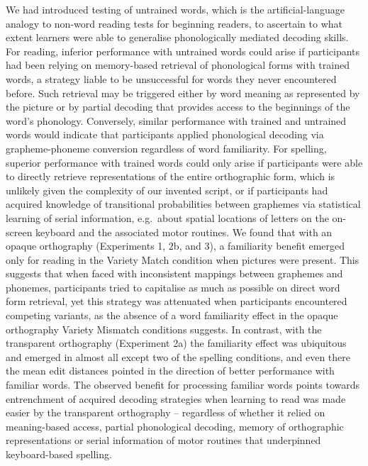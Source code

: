 \documentclass[doc,floatsintext]{apa6}
\begin{document}
We had introduced testing of untrained words, which is the
artificial-language analogy to non-word reading tests for beginning
readers, to ascertain to what extent learners were able to generalise
phonologically mediated decoding skills. For reading, inferior
performance with untrained words could arise if participants had been
relying on memory-based retrieval of phonological forms with trained
words, a strategy liable to be unsuccessful for words they never
encountered before. Such retrieval may be triggered either by word
meaning as represented by the picture or by partial decoding that
provides access to the beginnings of the word's phonology. Conversely,
similar performance with trained and untrained words would indicate that
participants applied phonological decoding via grapheme-phoneme
conversion regardless of word familiarity. For spelling, superior
performance with trained words could only arise if participants were
able to directly retrieve representations of the entire orthographic
form, which is unlikely given the complexity of our invented script, or
if participants had acquired knowledge of transitional probabilities
between graphemes via statistical learning of serial information,
e.g.~about spatial locations of letters on the on-screen keyboard and
the associated motor routines. We found that with an opaque orthography
(Experiments 1, 2b, and 3), a familiarity benefit emerged only for
reading in the Variety Match condition when pictures were present. This
suggests that when faced with inconsistent mappings between graphemes
and phonemes, participants tried to capitalise as much as possible on
direct word form retrieval, yet this strategy was attenuated when
participants encountered competing variants, as the absence of a word
familiarity effect in the opaque orthography Variety Mismatch conditions
suggests. In contrast, with the transparent orthography (Experiment 2a)
the familiarity effect was ubiquitous and emerged in almost all except
two of the spelling conditions, and even there the mean edit distances
pointed in the direction of better performance with familiar words. The
observed benefit for processing familiar words points towards
entrenchment of acquired decoding strategies when learning to read was
made easier by the transparent orthography -- regardless of whether it
relied on meaning-based access, partial phonological decoding, memory of
orthographic representations or serial information of motor routines
that underpinned keyboard-based spelling.
\end{document}
